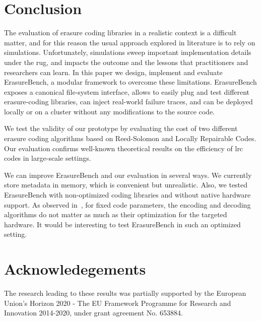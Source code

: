 \vspace{-0.5mm}
\section{Conclusion}
\label{sec:conclusion}
The evaluation of erasure coding libraries in a realistic context is a difficult matter, and for this reason the usual approach explored in literature is to rely on simulations.
Unfortunately, simulations sweep important implementation details under the rug, and impacts the outcome and the lessons that practitioners and researchers can learn. In this paper we design, implement and evaluate ErasureBench, a modular framework to overcome these limitations.
ErasureBench exposes a canonical file-system interface, allows to easily plug and test different erasure-coding libraries, can inject real-world failure traces, and can be deployed locally or on a cluster without any modifications to the source code.

We test the validity of our prototype by evaluating the cost of two different erasure coding algorithms based on Reed-Solomon and Locally Repairable Codes. 
Our evaluation confirms well-known theoretical results on the efficiency of \ac{lrc} codes in large-scale settings.  

We can improve ErasureBench and our evaluation in several ways. We currently store metadata in memory, which is convenient but unrealistic. 
Also, we tested ErasureBench with non-optimized coding libraries and without native hardware support. 
As observed in~\cite{Burihabwa2016}, for fixed code parameters, the encoding and decoding algorithms do not matter as much as their optimization for the targeted hardware. It would be interesting to test ErasureBench in such an optimized setting.

\section{Acknowledegements}
The research leading to these results was partially supported by the European Union's Horizon 2020 -  The EU Framework Programme for Research and Innovation 2014-2020, under grant agreement No. 653884.